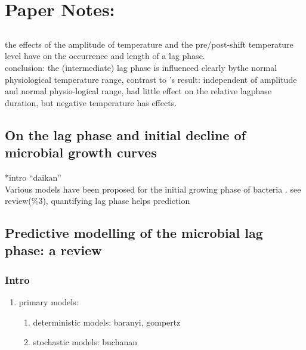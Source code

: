 \section{Paper Notes:}


\subsection{\citep{swinnen2005quantifying}}
the effects of the amplitude of temperature and the pre/post-shift temperature level have on the occurrence and length of a lag phase.\\
conclusion: the (intermediate) lag phase is influenced clearly bythe normal physiological temperature range, contrast to \citep{mellefont2003effect}'s result: independent of amplitude and normal physio-logical range, had little effect on the relative lagphase duration, but negative temperature has effects.\\


\subsection{On the lag phase and initial decline of microbial growth curves \citep{yates2007lag}}
*intro “daikan”\\
Various models have been proposed for the initial growing phase of bacteria \citep{baranyi1998comparison, baranyi1993non, baranyi1994dynamic, hills1994new, mckellar1997heterogeneous, mckellar2001development}. see review\citep{swinnen2004predictive}(\%3), quantifying lag phase helps prediction\citep{baty2004estimating} 


\subsection{Predictive modelling of the microbial lag phase: a review \citep{swinnen2004predictive}}
\subsubsection{Intro}
\begin{enumerate}
    \item primary models:
    \begin{enumerate}
        \item deterministic models: baranyi, gompertz
        \item stochastic models: buchanan
    \end{enumerate}
\end{enumerate}

